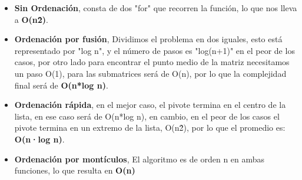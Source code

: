
\begin{itemize}
    \item \textbf{Sin Ordenación}, consta de dos "for" que recorren la función, lo que nos lleva a \textbf{O(n\^2)}.
    \item \textbf{Ordenación por fusión}, Dividimos el problema en dos iguales, esto está representado por "log n", y el número de pasos es "log(n+1)" en el peor de los casos, por otro lado para encontrar el punto medio de la matriz necesitamos un paso O(1), para las submatrices será de O(n), por lo que la complejidad final será de \textbf{O(n*log n)}.
    \item \textbf{Ordenación rápida}, en el mejor caso, el pivote termina en el centro de la lista, en ese caso será de O(n*log n), en cambio, en el peor de los casos el pivote termina en un extremo de la lista, O(n\^2), por lo que el promedio es: \textbf{O(n·log n)}.
    \item \textbf{Ordenación por montículos}, El algoritmo es de orden n en ambas funciones, lo que resulta en \textbf{O(n)}
\end{itemize}
\pagebreak